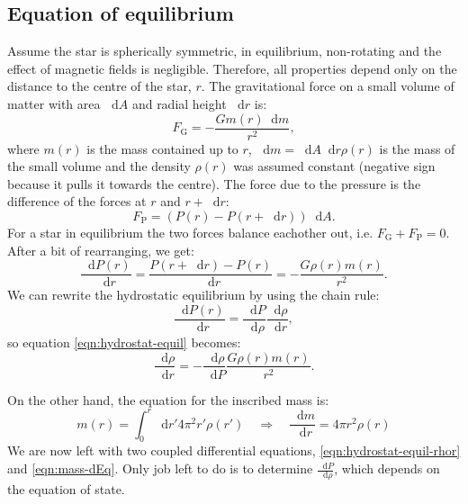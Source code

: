 \documentclass[]{article}
\newcommand{\dd}{\mathop{}\!\mathrm{d}}
\begin{document}
\subsection{Equation of equilibrium}\label{subsec:test}
Assume the star is spherically symmetric, in equilibrium, non-rotating and the effect of magnetic fields is negligible. Therefore, all properties depend only on the distance to the centre of the star, $r$. The gravitational force on a small volume of matter with area $\dd A$ and radial height $\dd r$ is:
\begin{equation}
	F_\mathrm{G} = - \frac{G m\left(r\right) \dd m}{r^2},
\end{equation}
where $m\left(r\right)$ is the mass contained up to $r$, $\dd m = \dd A \dd r \rho \left(r\right)$ is the mass of the small volume and the density $\rho \left(r\right)$ was assumed constant (negative sign because it pulls it towards the centre). The force due to the pressure is the difference of the forces at $r$ and $r + \dd r$:
\begin{equation}
	F_\mathrm{P} = \left( P\left(r\right) - P\left(r + \dd r\right)\right) \dd A.
\end{equation}
For a star in equilibrium the two forces balance eachother out, i.e. $F_\mathrm{G} + F_\mathrm{P} = 0$. After a bit of rearranging, we get:
\begin{equation} \label{eqn:hydrostat-equil}
	\frac{\dd P(r)}{\dd r} = \frac{P\left(r + \dd r\right) - P\left(r\right)}{\dd r} = - \frac{G \rho(r) m(r)}{r^2}.
\end{equation}
We can rewrite the hydrostatic equilibrium by using the chain rule:
\begin{equation}
	\frac{\dd P(r)}{\dd r} = \frac{\dd P}{\dd \rho} \frac{\dd \rho}{\dd r},
\end{equation}
so equation \eqref{eqn:hydrostat-equil} becomes:
\begin{equation}\label{eqn:hydrostat-equil-rhor}
	\frac{\dd \rho}{\dd r} = - \frac{\dd \rho}{\dd P} \frac{G \rho(r) m(r)}{r^2}.
\end{equation}

On the other hand, the equation for the inscribed mass is:
\begin{equation}\label{eqn:mass-dEq}
	m(r) = \int_0^r \dd r' 4 \pi^2 r' \rho\left(r'\right) \quad \Rightarrow \quad \frac{\dd m}{\dd r} = 4 \pi r^2 \rho(r)
\end{equation}
We are now left with two coupled differential equations, \eqref{eqn:hydrostat-equil-rhor} and \eqref{eqn:mass-dEq}. Only job left to do is to determine $\frac{\dd P}{\dd \rho}$, which depends on the equation of state.
\end{document}
